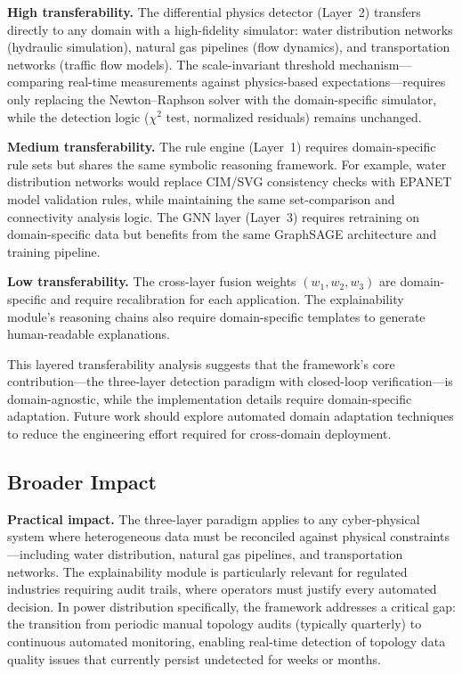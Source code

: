 \documentclass[research]{fcs}
\begin{document}
\textbf{High transferability.} The differential physics detector (Layer~2) transfers directly to any domain with a high-fidelity simulator: water distribution networks (hydraulic simulation), natural gas pipelines (flow dynamics), and transportation networks (traffic flow models). The scale-invariant threshold mechanism---comparing real-time measurements against physics-based expectations---requires only replacing the Newton--Raphson solver with the domain-specific simulator, while the detection logic ($\chi^2$ test, normalized residuals) remains unchanged.

\textbf{Medium transferability.} The rule engine (Layer~1) requires domain-specific rule sets but shares the same symbolic reasoning framework. For example, water distribution networks would replace CIM/SVG consistency checks with EPANET model validation rules, while maintaining the same set-comparison and connectivity analysis logic. The GNN layer (Layer~3) requires retraining on domain-specific data but benefits from the same GraphSAGE architecture and training pipeline.

\textbf{Low transferability.} The cross-layer fusion weights $(w_1, w_2, w_3)$ are domain-specific and require recalibration for each application. The explainability module's reasoning chains also require domain-specific templates to generate human-readable explanations.

This layered transferability analysis suggests that the framework's core contribution---the three-layer detection paradigm with closed-loop verification---is domain-agnostic, while the implementation details require domain-specific adaptation. Future work should explore automated domain adaptation techniques to reduce the engineering effort required for cross-domain deployment.

\subsection{Broader Impact}

\textbf{Practical impact.} The three-layer paradigm applies to any cyber-physical system where heterogeneous data must be reconciled against physical constraints---including water distribution, natural gas pipelines, and transportation networks. The explainability module is particularly relevant for regulated industries requiring audit trails, where operators must justify every automated decision. In power distribution specifically, the framework addresses a critical gap: the transition from periodic manual topology audits (typically quarterly) to continuous automated monitoring, enabling real-time detection of topology data quality issues that currently persist undetected for weeks or months.
\end{document}
